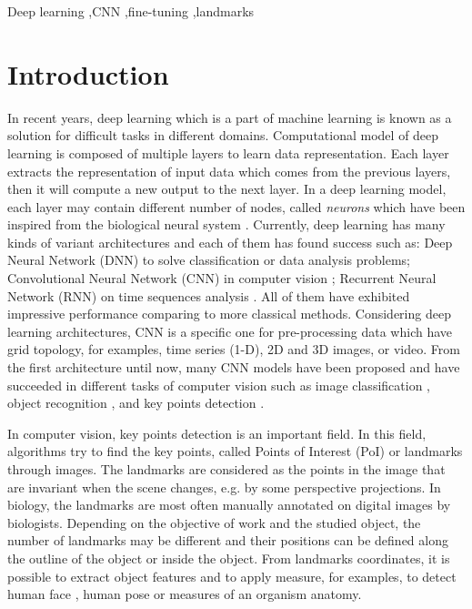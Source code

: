 \documentclass[review]{elsarticle}
\begin{document}
\begin{frontmatter}
\begin{abstract}
\end{abstract}

\begin{keyword}
Deep learning \sep CNN \sep fine-tuning \sep landmarks
\end{keyword}

\end{frontmatter}

\linenumbers

\section{Introduction}
\label{sIntroduction}
In recent years, deep learning which is a part of machine learning is known as a
solution for difficult tasks in different domains\cite{lecun2015deep}. Computational model of deep
learning is composed of multiple layers to learn data
representation. Each layer extracts the representation of input data
which comes from the previous layers, then it will compute a new
output to the next layer. In a deep learning model, each layer may
contain different number of nodes, called \textit{neurons} which have
been inspired from the biological neural system
\cite{arbib2012brains}. Currently, deep learning has many kinds of
variant architectures and each of them has found success such as: Deep
Neural Network (DNN) to solve classification or data analysis
problems\cite{hinton2012deep, mikolov2011strategies}; Convolutional
Neural Network (CNN) in computer vision \cite{lecun1998gradient,
  krizhevsky2012imagenet,szegedy2015going}; Recurrent Neural Network
(RNN) on time sequences analysis \cite{lecun2015deep,jean2014using,
  sutskever2014sequence,collobert2011natural}. All of
them have exhibited impressive performance comparing to more classical
methods. Considering deep learning architectures, CNN is a specific
one for pre-processing data which have grid topology, for
examples, time series (1-D), 2D and 3D images, or video. From the
first architecture \cite{lecun1998gradient} until now, many CNN models
have been proposed and have succeeded in different tasks of computer
vision such as image classification \cite{lecun1998gradient,
  krizhevsky2012imagenet,szegedy2015going}, object recognition
\cite{szegedy2015going,farabet2013learning,li2015convolutional}, and
key points detection \cite{liu2016fashion, sun2013deep,
  zhang2014facial, cintas2016automatic}.


In computer vision, key points detection is an important field. In
this field, algorithms try to find the key points, called Points of
Interest (PoI)  or landmarks through images. The landmarks are
considered as the points in the image that are invariant when the
scene changes, e.g. by some perspective projections. In biology, the
landmarks are most often manually annotated on digital images by
biologists. Depending on the objective of work and the studied object,
the number of landmarks may be different and their positions
 can be defined along the outline of the object or inside the
object. From landmarks coordinates, it is possible to extract object
features and to apply measure, for examples, to detect human face
\cite{sun2013deep}, human pose \cite{huang2017coarse} or measures of
an organism anatomy.
\end{document}
